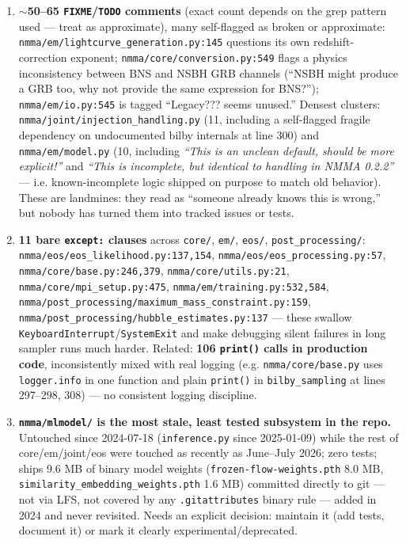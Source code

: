 \documentclass[10pt]{article}
\newcommand{\code}[1]{\texttt{#1}}
\begin{document}
\begin{enumerate}
\item \textbf{$\sim$50--65 \code{FIXME}/\code{TODO} comments} (exact count depends
  on the grep pattern used --- treat as approximate), many self-flagged as
  broken or approximate: \code{nmma/em/lightcurve\_generation.py:145} questions its
  own redshift-correction exponent; \code{nmma/core/conversion.py:549} flags a
  physics inconsistency between BNS and NSBH GRB channels (``NSBH might produce a
  GRB too, why not provide the same expression for BNS?''); \code{nmma/em/io.py:545}
  is tagged ``Legacy??? seems unused.'' Densest clusters:
  \code{nmma/joint/injection\_handling.py} (11, including a self-flagged fragile
  dependency on undocumented bilby internals at line 300) and \code{nmma/em/model.py}
  (10, including \emph{``This is an unclean default, should be more explicit!''} and
  \emph{``This is incomplete, but identical to handling in NMMA 0.2.2''} --- i.e.
  known-incomplete logic shipped on purpose to match old behavior). These are
  landmines: they read as ``someone already knows this is wrong,'' but nobody has
  turned them into tracked issues or tests.

\item \textbf{11 bare \code{except:} clauses} across \code{core/}, \code{em/},
  \code{eos/}, \code{post\_processing/}: \code{nmma/eos/eos\_likelihood.py:137,154},
  \code{nmma/eos/eos\_processing.py:57}, \code{nmma/core/base.py:246,379},
  \code{nmma/core/utils.py:21}, \code{nmma/core/mpi\_setup.py:475},
  \code{nmma/em/training.py:532,584},
  \code{nmma/post\_processing/maximum\_mass\_constraint.py:159},
  \code{nmma/post\_processing/hubble\_estimates.py:137} --- these swallow
  \code{KeyboardInterrupt}/\code{SystemExit} and make debugging silent failures in
  long sampler runs much harder. Related: \textbf{106 \code{print()} calls in
  production code}, inconsistently mixed with real logging (e.g.
  \code{nmma/core/base.py} uses \code{logger.info} in one function and plain
  \code{print()} in \code{bilby\_sampling} at lines 297--298, 308) --- no
  consistent logging discipline.

\item \textbf{\code{nmma/mlmodel/} is the most stale, least tested subsystem in the
  repo.} Untouched since 2024-07-18 (\code{inference.py} since 2025-01-09) while
  the rest of core/em/joint/eos were touched as recently as June--July 2026; zero
  tests; ships 9.6 MB of binary model weights
  (\code{frozen-flow-weights.pth} 8.0 MB, \code{similarity\_embedding\_weights.pth}
  1.6 MB) committed directly to git --- not via LFS, not covered by any
  \code{.gitattributes} binary rule --- added in 2024 and never revisited. Needs an
  explicit decision: maintain it (add tests, document it) or mark it clearly
  experimental/deprecated.


\end{enumerate}
\end{document}
